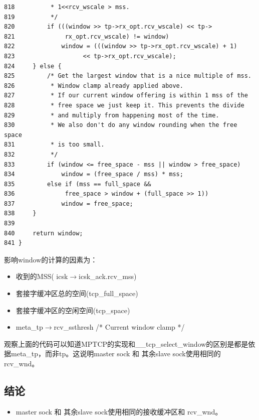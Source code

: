 \begin{verbatim}
818          * 1<<rcv_wscale > mss.
819          */
820         if (((window >> tp->rx_opt.rcv_wscale) << tp->
821              rx_opt.rcv_wscale) != window)
822             window = (((window >> tp->rx_opt.rcv_wscale) + 1)
823                   << tp->rx_opt.rcv_wscale);
824     } else {
825         /* Get the largest window that is a nice multiple of mss.
826          * Window clamp already applied above.
827          * If our current window offering is within 1 mss of the
828          * free space we just keep it. This prevents the divide
829          * and multiply from happening most of the time.
830          * We also don't do any window rounding when the free space
831          * is too small.
832          */
833         if (window <= free_space - mss || window > free_space)
834             window = (free_space / mss) * mss;
835         else if (mss == full_space &&
836              free_space > window + (full_space >> 1))
837             window = free_space;
838     }
839
840     return window;
841 }
\end{verbatim}\normalsize
影响window的计算的因素为：
\begin{itemize}
  \item 收到的MSS( icsk$\rightarrow$icsk\_ack.rcv\_mss)
  \item 套接字缓冲区总的空间(tcp\_full\_space)
  \item 套接字缓冲区的空闲空间(tcp\_space)
  \item meta\_tp$\rightarrow$rcv\_ssthresh  /* Current window clamp */
\end{itemize}
观察上面的代码可以知道MPTCP的实现和\_\_tcp\_select\_window的区别是都是依据meta\_tp，而非tp。这说明master sock 和 其余slave sock使用相同的 rcv\_wnd。
\subsection{结论}
\begin{itemize}
  \item master sock 和 其余slave sock使用相同的接收缓冲区和 rcv\_wnd。
\end{itemize}